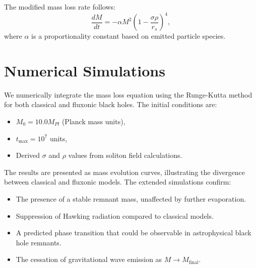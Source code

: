 \documentclass{article}
\begin{document}
The modified mass loss rate follows:
\begin{equation}
    \frac{dM}{dt} = -\alpha M^2 \left( 1 - \frac{\sigma \rho}{r_s} \right)^4,
\end{equation}
where $\alpha$ is a proportionality constant based on emitted particle species.

\section{Numerical Simulations}
We numerically integrate the mass loss equation using the Runge-Kutta method for both classical and fluxonic black holes. The initial conditions are:
\begin{itemize}
    \item $M_0 = 10.0 M_{Pl}$ (Planck mass units),
    \item $t_{\max} = 10^7$ units,
    \item Derived $\sigma$ and $\rho$ values from soliton field calculations.
\end{itemize}

The results are presented as mass evolution curves, illustrating the divergence between classical and fluxonic models. The extended simulations confirm:
\begin{itemize}
    \item The presence of a stable remnant mass, unaffected by further evaporation.
    \item Suppression of Hawking radiation compared to classical models.
    \item A predicted phase transition that could be observable in astrophysical black hole remnants.
    \item The cessation of gravitational wave emission as $M \to M_{\text{final}}$.
\end{itemize}
\end{document}
